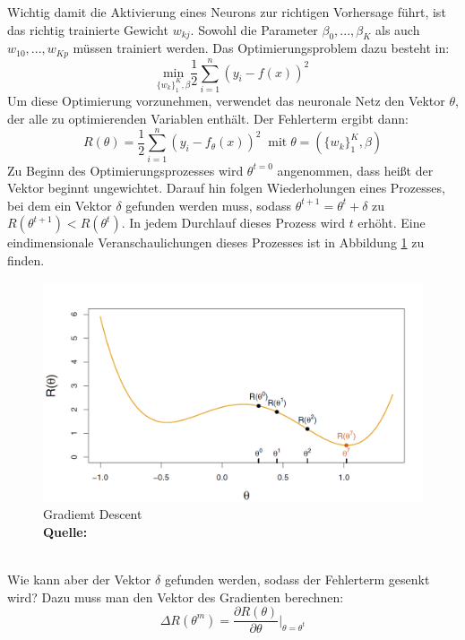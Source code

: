 \documentclass[a4paper,12pt]{thesis}
\newcommand*{\captionsource}[2]{%
	\caption[{#1}]{%
		#1%
		\\\hspace{\linewidth}%
		\textbf{Quelle:} #2%
	}%
}
\begin{document}
Wichtig damit die Aktivierung eines Neurons zur richtigen Vorhersage führt, ist das richtig trainierte Gewicht $w_{kj}$. Sowohl die Parameter $\beta_0, ..., \beta_K$ als auch $w_{10}, ..., w_{Kp}$ müssen trainiert werden. Das Optimierungsproblem dazu besteht in:
\begin{equation}
	\label{NN:Optimization}
	\underset{ \{ w_k \}^K_1 , \beta }{\text{min}}\frac{1}{2}\sum_{i=1}^n (y_i-f(x))^2
\end{equation}
Um diese Optimierung vorzunehmen, verwendet das neuronale Netz den Vektor $\theta$, der alle zu optimierenden Variablen enthält. Der Fehlerterm ergibt dann:
\begin{equation}
	\label{NN:ErrorTerm}
	R(\theta)=\frac{1}{2}\sum_{i=1}^n (y_i-f_{\theta}(x))^2 \; \; \text{mit} \; \theta=(\{ w_k \}^K_1,\beta)
\end{equation}
Zu Beginn des Optimierungsprozesses wird $\theta^{t=0}$ angenommen, dass heißt der Vektor beginnt ungewichtet. Darauf hin folgen Wiederholungen eines Prozesses, bei dem ein Vektor $\delta$ gefunden werden muss, sodass $\theta^{t+1}=\theta^t + \delta$ zu $R(\theta^{t+1})<R(\theta^t)$. In jedem Durchlauf dieses Prozess wird $t$ erhöht. Eine eindimensionale Veranschaulichungen dieses Prozesses ist in Abbildung \ref{NN3} zu finden.
\begin{figure}[!ht]
	\centering
	\includegraphics[width=14cm]{Plots/NN3.png}
	\captionsource{Gradiemt Descent}{
		\cite{James2013DL}
	}
	\label{NN3}
\end{figure}\\
Wie kann aber der Vektor $\delta$ gefunden werden, sodass der Fehlerterm gesenkt wird? Dazu muss man den Vektor des Gradienten berechnen:
\begin{equation}
	\label{NN:GradientVector}
	\Delta R(\theta^m)=\frac{\partial R(\theta)}{\partial \theta}|_{\theta=\theta^t}
\end{equation}
\end{document}
